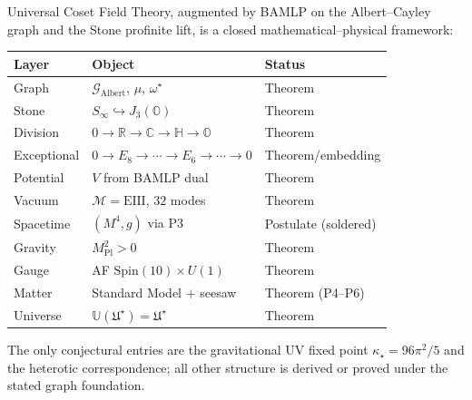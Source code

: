 \begin{theorem}\label{thm:identification:complete}
Universal Coset Field Theory, augmented by BAMLP on the Albert--Cayley graph
and the Stone profinite lift, is a closed mathematical--physical framework:
\begin{center}
\small
\begin{tabular}{@{}lll@{}}
\toprule
Layer & Object & Status \\
\midrule
Graph & $\mathcal{G}_{\mathrm{Albert}}$, $\mu$, $\omega^\star$ & Theorem \\
Stone & $S_\infty\hookrightarrow J_3(\mathbb{O})$ & Theorem \\
Division & $0\to\mathbb{R}\to\mathbb{C}\to\mathbb{H}\to\mathbb{O}$ & Theorem \\
Exceptional & $0\to E_8\to\cdots\to E_6\to\cdots\to 0$ & Theorem/embedding \\
Potential & $V$ from BAMLP dual & Theorem \\
Vacuum & $\mathcal{M}=\mathrm{EIII}$, $32$ modes & Theorem \\
Spacetime & $(M^4,g)$ via P3 & Postulate (soldered) \\
Gravity & $M_{\mathrm{Pl}}^2>0$ & Theorem \\
Gauge & AF $\mathrm{Spin}(10)\times U(1)$ & Theorem \\
Matter & Standard Model $+$ seesaw & Theorem (P4--P6) \\
Universe & $\mathbb{U}(\mathfrak{U}^\star)=\mathfrak{U}^\star$ & Theorem \\
\bottomrule
\end{tabular}
\end{center}
The only conjectural entries are the gravitational UV fixed point
$\kappa_\star=96\pi^2/5$ and the heterotic correspondence; all other structure
is derived or proved under the stated graph foundation.
\end{theorem}
